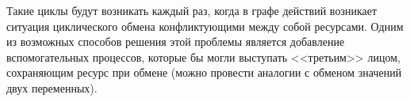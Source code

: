 Такие циклы будут возникать каждый раз, когда в графе действий возникает ситуация циклического обмена конфликтующими между собой ресурсами. Одним из возможных способов решения этой проблемы является добавление вспомогательных процессов,
которые бы могли выступать <<третьим>> лицом, сохраняющим ресурс при обмене (можно провести аналогии с обменом значений двух переменных).



